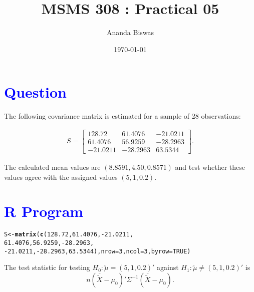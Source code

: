 \documentclass[11pt, a4paper]{article}\usepackage[]{graphicx}\usepackage[]{xcolor}
\title{MSMS 308 : Practical 05}
\author{Ananda Biswas}
\date{\today}
\makeatletter
\newcommand{\hlnum}[1]{\textcolor[rgb]{0.686,0.059,0.569}{#1}}%
\newcommand{\hlopt}[1]{\textcolor[rgb]{0,0,0}{#1}}%
\newcommand{\hldef}[1]{\textcolor[rgb]{0.345,0.345,0.345}{#1}}%
\newcommand{\hlkwb}[1]{\textcolor[rgb]{0.69,0.353,0.396}{#1}}%
\newcommand{\hlkwc}[1]{\textcolor[rgb]{0.333,0.667,0.333}{#1}}%
\newcommand{\hlkwd}[1]{\textcolor[rgb]{0.737,0.353,0.396}{\textbf{#1}}}%
\newenvironment{kframe}{%
 \def\at@end@of@kframe{}%
 \ifinner\ifhmode%
  \def\at@end@of@kframe{\end{minipage}}%
  \begin{minipage}{\columnwidth}%
 \fi\fi%
 \def\FrameCommand##1{\hskip\@totalleftmargin \hskip-\fboxsep
 \colorbox{shadecolor}{##1}\hskip-\fboxsep
     \hskip-\linewidth \hskip-\@totalleftmargin \hskip\columnwidth}%
 \MakeFramed {\advance\hsize-\width
   \@totalleftmargin\z@ \linewidth\hsize
   \@setminipage}}%
 {\par\unskip\endMakeFramed%
 \at@end@of@kframe}
\newenvironment{knitrout}{}{} %
\makeatother
\begin{document}
\maketitle


\section*{\faArrowAltCircleRight[regular] \textcolor{blue}{Question}}

\hspace{1cm} The following covariance matrix is estimated for a sample of 28 observations:

\begin{gather*}
S =
\begin{bmatrix}
128.72 & 61.4076 & -21.0211 \\
61.4076 & 56.9259 & -28.2963 \\
-21.0211 & -28.2963 & 63.5344
\end{bmatrix}.
\end{gather*}

The calculated mean values are $(8.8591, 4.50, 0.8571)$ and test whether these values agree with the assigned values $(5, 1, 0.2)$.

\section*{\faArrowAltCircleRight[regular] \textcolor{blue}{R Program}}

\begin{knitrout}
\color{fgcolor}\begin{kframe}
\begin{alltt}
\hldef{S} \hlkwb{<-} \hlkwd{matrix}\hldef{(}\hlkwd{c}\hldef{(}\hlnum{128.72}\hldef{,} \hlnum{61.4076}\hldef{,} \hlopt{-}\hlnum{21.0211}\hldef{,}
              \hlnum{61.4076}\hldef{,} \hlnum{56.9259}\hldef{,} \hlopt{-}\hlnum{28.2963}\hldef{,}
              \hlopt{-}\hlnum{21.0211}\hldef{,} \hlopt{-}\hlnum{28.2963}\hldef{,} \hlnum{63.5344}\hldef{),} \hlkwc{nrow} \hldef{=} \hlnum{3}\hldef{,} \hlkwc{ncol} \hldef{=} \hlnum{3}\hldef{,} \hlkwc{byrow} \hldef{=} \hlnum{TRUE}\hldef{)}
\end{alltt}
\end{kframe}
\end{knitrout}

 The test statistic for testing $H_0 : \utilde{\mu} = (5, 1, 0.2)'$ against $H_1 : \utilde{\mu} \neq (5, 1, 0.2)'$ is $$n(\overline{\utilde{X}} - \mu_0)' \Sigma^{-1} (\overline{\utilde{X}} - \mu_0).$$
\end{document}
